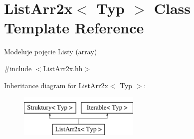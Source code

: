 \hypertarget{class_list_arr2x}{\section{List\-Arr2x$<$ Typ $>$ Class Template Reference}
\label{class_list_arr2x}
}


Modeluje pojęcie Listy (array)  




{\ttfamily \#include $<$List\-Arr2x.\-hh$>$}

Inheritance diagram for List\-Arr2x$<$ Typ $>$\-:\begin{figure}[H]
\begin{center}
\leavevmode
\includegraphics[height=2.000000cm]{class_list_arr2x}
\end{center}
\end{figure}
